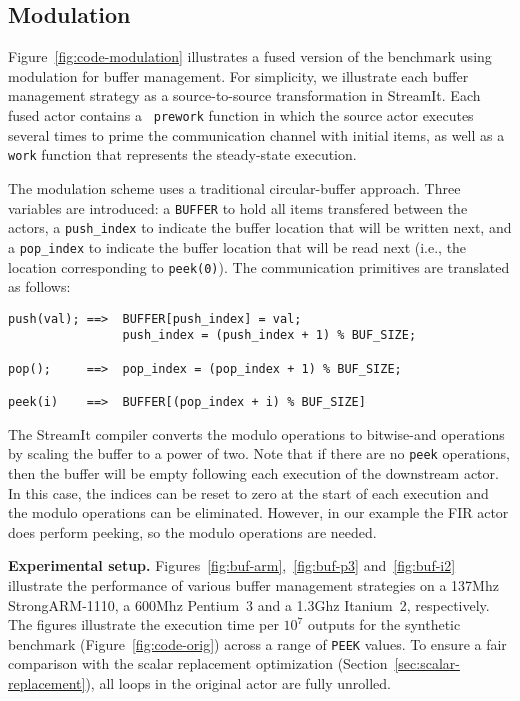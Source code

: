 

\subsection{Modulation}

Figure~\ref{fig:code-modulation} illustrates a fused version of the
benchmark using modulation for buffer management.  For simplicity, we
illustrate each buffer management strategy as a source-to-source
transformation in StreamIt.  Each fused actor contains a {\tt
prework} function in which the source actor executes several times to
prime the communication channel with initial items, as well as a {\tt
work} function that represents the steady-state execution.

The modulation scheme uses a traditional circular-buffer approach.
Three variables are introduced: a {\tt BUFFER} to hold all items
transfered between the actors, a {\tt push\_index} to indicate the
buffer location that will be written next, and a {\tt pop\_index} to
indicate the buffer location that will be read next (i.e., the
location corresponding to {\tt peek(0)}).  The communication
primitives are translated as follows: 

{\scriptsize
\begin{verbatim}
push(val); ==>  BUFFER[push_index] = val;
                push_index = (push_index + 1) % BUF_SIZE;

pop();     ==>  pop_index = (pop_index + 1) % BUF_SIZE;

peek(i)    ==>  BUFFER[(pop_index + i) % BUF_SIZE]
\end{verbatim}}
\noindent The StreamIt compiler converts the modulo operations to
bitwise-and operations by scaling the buffer to a power of two.  Note
that if there are no {\tt peek} operations, then the buffer will be
empty following each execution of the downstream actor.  In this
case, the indices can be reset to zero at the start of each execution
and the modulo operations can be eliminated.  However, in our example
the FIR actor does perform peeking, so the modulo operations are
needed.

{\bf Experimental setup.}  Figures~\ref{fig:buf-arm},~\ref{fig:buf-p3}
and~\ref{fig:buf-i2} illustrate the performance of various buffer
management strategies on a 137Mhz StrongARM-1110, a 600Mhz Pentium~3
and a 1.3Ghz Itanium~2, respectively.  The figures illustrate the
execution time per $10^7$ outputs for the synthetic benchmark
(Figure~\ref{fig:code-orig}) across a range of {\tt PEEK} values.  To
ensure a fair comparison with the scalar replacement optimization
(Section~\ref{sec:scalar-replacement}), all loops in the original
actor are fully unrolled.

